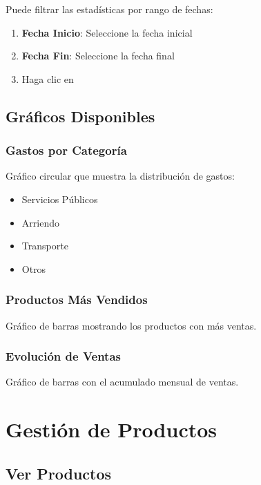 \documentclass[12pt,a4paper]{article}
\begin{document}
Puede filtrar las estadísticas por rango de fechas:

\begin{enumerate}
    \item \textbf{Fecha Inicio}: Seleccione la fecha inicial
    \item \textbf{Fecha Fin}: Seleccione la fecha final
    \item Haga clic en 
\end{enumerate}

\subsection{Gráficos Disponibles}

\subsubsection{Gastos por Categoría}

Gráfico circular que muestra la distribución de gastos:

\begin{itemize}
    \item \textcolor{primary}{\faCircle} Servicios Públicos
    \item \textcolor{secondary}{\faCircle} Arriendo
    \item \textcolor{blue}{\faCircle} Transporte
    \item \textcolor{orange}{\faCircle} Otros
\end{itemize}

\subsubsection{Productos Más Vendidos}

Gráfico de barras mostrando los productos con más ventas.

\subsubsection{Evolución de Ventas}

Gráfico de barras con el acumulado mensual de ventas.

\newpage

\section{Gestión de Productos}

\subsection{Ver Productos}
\end{document}

